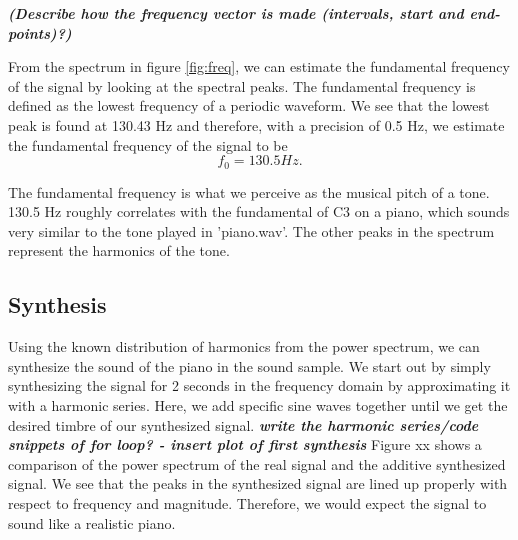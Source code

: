 \documentclass[journal]{IEEEtran}
\begin{document}
\textbf{\textit{(Describe how the frequency vector is made (intervals, start and end-points)?)}}

\newline
From the spectrum in figure \ref{fig:freq}, we can estimate the fundamental frequency of the signal by looking at the spectral peaks. The fundamental frequency is defined as the lowest frequency of a periodic waveform. %
We see that the lowest peak is found at 130.43 Hz and therefore, with a precision of 0.5 Hz, we estimate the fundamental frequency of the signal to be
\begin{equation}
    f_0 = 130.5 Hz.
\end{equation}

The fundamental frequency is what we perceive as the musical pitch of a tone. 130.5 Hz roughly correlates with the fundamental of C3 on a piano, which sounds very similar to the tone played in 'piano.wav'. The other peaks in the spectrum represent the harmonics of the tone. 

\subsection{Synthesis}
Using the known distribution of harmonics from the power spectrum, we can synthesize the sound of the piano in the sound sample. We start out by simply synthesizing the signal for 2 seconds in the frequency domain by approximating it with a harmonic series. Here, we add specific sine waves together until we get the desired timbre of our synthesized signal. 
\newline
\textbf{\textit{write the harmonic series/code snippets of for loop? - insert plot of first synthesis}}
\newline
Figure xx shows a comparison of the power spectrum of the real signal and the additive synthesized signal. We see that the peaks in the synthesized signal are lined up properly with respect to frequency and magnitude. Therefore, we would expect the signal to sound like a realistic piano. 



\end{document}
